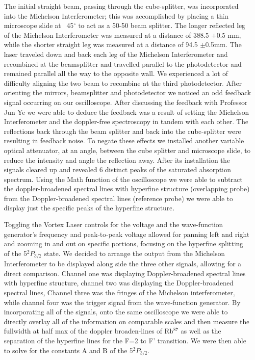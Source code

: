 \documentclass[12pt]{article}
\begin{document}
The initial straight beam, passing through the cube-splitter, was incorporated into the Michelson Interferometer; this was accomplished by placing a thin microscope slide at ~45$^{\circ}$ to act as a 50-50 beam splitter. The longer reflected leg of the Michelson Interferometer was measured at a distance of 388.5 $\pm $0.5 mm, while the shorter straight leg was measured at a distance of 94.5 $\pm $0.5mm. The laser traveled down and back each leg of the Michelson Interferometer and recombined at the beamsplitter and travelled parallel to the photodetector and remained parallel all the way to the opposite wall. We experienced a lot of difficulty aligning the two beam to recombine at the third photodetector. After orienting the mirrors, beamsplitter and photodetector we noticed an odd feedback signal occurring on our oscilloscope. After discussing the feedback with Professor Jun Ye we were able to deduce the feedback was a result of setting the Michelson Interferometer and the doppler-free spectroscopy in tandem with each other. The reflections back through the beam splitter and back into the cube-splitter were resulting in feedback noise. To negate these effects we installed another variable optical attenuator, at an angle, between the cube splitter and microscope slide, to reduce the intensity and angle the reflection away. After its installation the signals cleared up and revealed 6 distinct peaks of the saturated absorption spectrum. Using the Math function of the oscilloscope we were able to subtract the doppler-broadened spectral lines with hyperfine structure (overlapping probe) from the Doppler-broadened spectral lines (reference probe) we were able to display just the specific peaks of the hyperfine structure. 

Toggling the Vortex Laser controls for the voltage and the wave-function generator's frequency and peak-to-peak voltage allowed for panning left and right and zooming in and out on specific portions, focusing on the hyperfine splitting of the 5$^2P_{3/2} $ state.  We decided to arrange the output from the Michelson Interferometer to be displayed along side the three other signals, allowing for a direct comparison. Channel one was displaying Doppler-broadened spectral lines with hyperfine structure, channel two was displaying the Doppler-broadened spectral lines, Channel three was the fringes of the Michelson interferometer, while channel four was the trigger signal from the wave-function generator. By incorporating all of the signals, onto the same oscilloscope we were able to directly overlay all of the information on comparable scales and then measure the fullwidth at half max  of the doppler broaden-lines of Rb$^{87} $ as well as the separation of the hyperfine lines for the F=2 to F' transition. We were then able to solve for the constants A and B of the 5$^2 P_{3/2}$.
\end{document}
